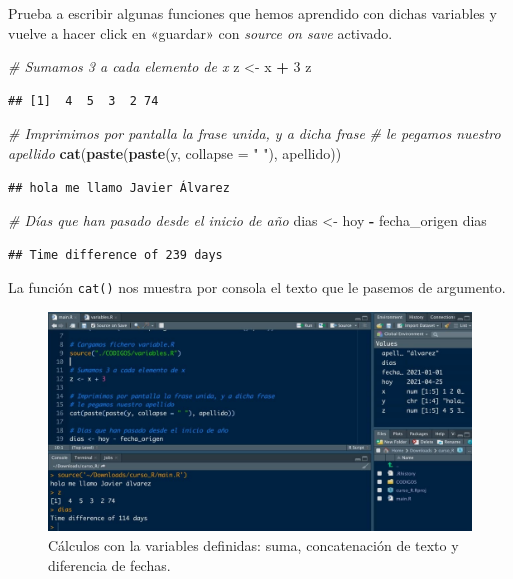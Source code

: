 \documentclass[11pt,]{book}
\newenvironment{Shaded}{\begin{snugshade}}{\end{snugshade}}
\newcommand{\CommentTok}[1]{\textcolor[rgb]{0.37,0.37,0.37}{\textit{#1}}}
\newcommand{\DataTypeTok}[1]{\textcolor[rgb]{0.27,0.27,0.27}{#1}}
\newcommand{\DecValTok}[1]{\textcolor[rgb]{0.06,0.06,0.06}{#1}}
\newcommand{\KeywordTok}[1]{\textcolor[rgb]{0.27,0.27,0.27}{\textbf{#1}}}
\newcommand{\NormalTok}[1]{#1}
\newcommand{\OperatorTok}[1]{\textcolor[rgb]{0.43,0.43,0.43}{\textbf{#1}}}
\newcommand{\StringTok}[1]{\textcolor[rgb]{0.5,0.5,0.5}{#1}}
\begin{document}
Prueba a escribir algunas funciones que hemos aprendido con dichas variables y vuelve a hacer click en «guardar» con \emph{source on save} activado.

\begin{Shaded}
\begin{Highlighting}[]
\CommentTok{# Sumamos 3 a cada elemento de x}
\NormalTok{z <-}\StringTok{ }\NormalTok{x }\OperatorTok{+}\StringTok{ }\DecValTok{3}
\NormalTok{z}
\end{Highlighting}
\end{Shaded}

\begin{verbatim}
## [1]  4  5  3  2 74
\end{verbatim}

\begin{Shaded}
\begin{Highlighting}[]
\CommentTok{# Imprimimos por pantalla la frase unida, y a dicha frase}
\CommentTok{# le pegamos nuestro apellido}
\KeywordTok{cat}\NormalTok{(}\KeywordTok{paste}\NormalTok{(}\KeywordTok{paste}\NormalTok{(y, }\DataTypeTok{collapse =} \StringTok{" "}\NormalTok{), apellido))}
\end{Highlighting}
\end{Shaded}

\begin{verbatim}
## hola me llamo Javier Álvarez
\end{verbatim}

\begin{Shaded}
\begin{Highlighting}[]
\CommentTok{# Días que han pasado desde el inicio de año}
\NormalTok{dias <-}\StringTok{ }\NormalTok{hoy }\OperatorTok{-}\StringTok{ }\NormalTok{fecha_origen}
\NormalTok{dias}
\end{Highlighting}
\end{Shaded}

\begin{verbatim}
## Time difference of 239 days
\end{verbatim}

La función \texttt{cat()} nos muestra por consola el texto que le pasemos de argumento.

\begin{figure}

{\centering \includegraphics[width=0.5\linewidth]{./img/codigo_1} 

}

\caption{Cálculos con la variables definidas: suma, concatenación de texto y diferencia de fechas.}\label{fig:codigo-1}
\end{figure}
\end{document}
